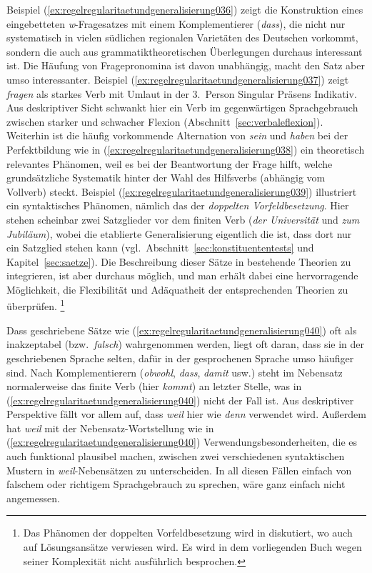 Beispiel (\ref{ex:regelregularitaetundgeneralisierung036}) zeigt die Konstruktion eines eingebetteten \textit{w}-Fragesatzes mit einem Komplementierer (\textit{dass}), die nicht nur systematisch in vielen südlichen regionalen Varietäten des Deutschen vorkommt, sondern die auch aus grammatiktheoretischen Überlegungen durchaus interessant ist.
Die Häufung von Fragepronomina ist davon unabhängig, macht den Satz aber umso interessanter.
Beispiel (\ref{ex:regelregularitaetundgeneralisierung037}) zeigt \textit{fragen} als starkes Verb mit Umlaut in der 3.\ Person Singular Präsens Indikativ.
Aus deskriptiver Sicht schwankt hier ein Verb im gegenwärtigen Sprachgebrauch zwischen starker und schwacher Flexion (Abschnitt~\ref{sec:verbaleflexion}).
Weiterhin ist die häufig vorkommende Alternation von \textit{sein} und \textit{haben} bei der Perfektbildung wie in (\ref{ex:regelregularitaetundgeneralisierung038}) ein theoretisch relevantes Phänomen, weil es bei der Beantwortung der Frage hilft, welche grundsätzliche Systematik hinter der Wahl des Hilfsverbs (abhängig vom Vollverb) steckt.
Beispiel (\ref{ex:regelregularitaetundgeneralisierung039}) illustriert ein syntaktisches Phänomen, nämlich das der \textit{doppelten Vorfeldbesetzung}.
Hier stehen scheinbar zwei Satzglieder vor dem finiten Verb (\textit{der Universität} und \textit{zum Jubiläum}), wobei die etablierte Generalisierung eigentlich die ist, dass dort nur ein Satzglied stehen kann (vgl.\ Abschnitt~\ref{sec:konstituententests} und Kapitel~\ref{sec:saetze}).
Die Beschreibung dieser Sätze in bestehende Theorien zu integrieren, ist aber durchaus möglich, und man erhält dabei eine hervorragende Möglichkeit, die Flexibilität und Adäquatheit der entsprechenden Theorien zu überprüfen.%
\footnote{Das Phänomen der doppelten Vorfeldbesetzung wird in \citet{Mueller2003} diskutiert, wo auch auf Lösungsansätze verwiesen wird.
Es wird in dem vorliegenden Buch wegen seiner Komplexität nicht ausführlich besprochen.}

Dass geschriebene Sätze wie (\ref{ex:regelregularitaetundgeneralisierung040}) oft als inakzeptabel (bzw.\ \textit{falsch}) wahrgenommen werden, liegt oft daran, dass sie in der geschriebenen Sprache selten, dafür in der gesprochenen Sprache umso häufiger sind.
Nach Komplementierern (\textit{obwohl}, \textit{dass}, \textit{damit} usw.) steht im Nebensatz normalerweise das finite Verb (hier \textit{kommt}) an letzter Stelle, was in (\ref{ex:regelregularitaetundgeneralisierung040}) nicht der Fall ist.
Aus deskriptiver Perspektive fällt vor allem auf, dass \textit{weil} hier wie \textit{denn} verwendet wird.
Außerdem hat \textit{weil} mit der Nebensatz-Wortstellung wie in (\ref{ex:regelregularitaetundgeneralisierung040}) Verwendungsbesonderheiten, die es auch funktional plausibel machen, zwischen zwei verschiedenen syntaktischen Mustern in \textit{weil}-Nebensätzen zu unterscheiden.
In all diesen Fällen einfach von falschem oder richtigem Sprachgebrauch zu sprechen, wäre ganz einfach nicht angemessen.

